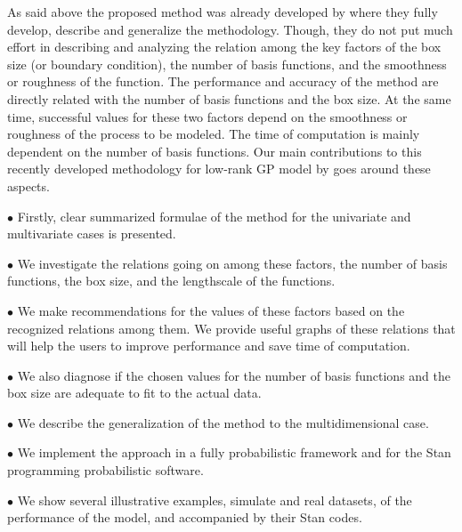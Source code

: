\documentclass[]{interact}
\theoremstyle{plain}%
\theoremstyle{definition}
\theoremstyle{remark}
\begin{document}
As said above the proposed method was already developed by \cite{solin2018hilbert} where they fully develop, describe and generalize the methodology. Though, they do not put much effort in describing and analyzing the relation among the key factors of the box size (or boundary condition), the number of basis functions, and the smoothness or roughness of the function. The performance and accuracy of the method are directly related with the number of basis functions and the box size. At the same time, successful values for these two factors depend on the smoothness or roughness of the process to be modeled. The time of computation is mainly dependent on the number of basis functions. Our main contributions to this recently developed methodology for low-rank GP model by \cite{solin2018hilbert} goes around these aspects.

\vspace{2mm}
$\bullet$ Firstly, clear summarized formulae of the method for the univariate and multivariate cases is presented. 

\vspace{2mm}
$\bullet$ We investigate the relations going on among these factors, the number of basis functions, the box size, and the lengthscale of the functions.

\vspace{2mm}
$\bullet$ We make recommendations for the values of these factors based on the recognized relations among them. We provide useful graphs of these relations that will help the users to improve performance and save time of computation.

\vspace{2mm}
$\bullet$ We also diagnose if the chosen values for the number of basis functions and the box size are adequate to fit to the actual data.

\vspace{2mm}
$\bullet$ We describe the generalization of the method to the multidimensional case.

\vspace{2mm}
$\bullet$ We implement the approach in a fully probabilistic framework and for the Stan programming probabilistic software.

\vspace{2mm}
$\bullet$ We show several illustrative examples, simulate and real datasets, of the performance of the model, and accompanied by their Stan codes.

 
\end{document}
